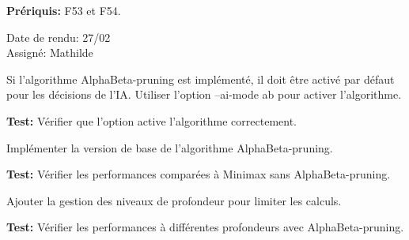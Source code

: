 \documentclass{article}
\begin{document}
\begin{needbox}

    \textbf{Prériquis:} F53 et F54.
    \begin{duedatebox}
        Date de rendu: 27/02\\
        Assigné: Mathilde
    \end{duedatebox}
    \begin{subneedbox}
        Si l'algorithme AlphaBeta-pruning est implémenté, il doit être activé par défaut pour les décisions de l'IA.
        Utiliser l'option --ai-mode ab pour activer l’algorithme.

        \textbf{Test:} Vérifier que l'option active l'algorithme correctement.
    \end{subneedbox}
    
    \begin{subneedbox}
        Implémenter la version de base de l’algorithme AlphaBeta-pruning.

        \textbf{Test:} Vérifier les performances comparées à Minimax sans AlphaBeta-pruning.
    \end{subneedbox}
    
    \begin{subneedbox}
        Ajouter la gestion des niveaux de profondeur pour limiter les calculs.

        \textbf{Test:} Vérifier les performances à différentes profondeurs avec AlphaBeta-pruning.
    \end{subneedbox}
\end{needbox}
\end{document}
